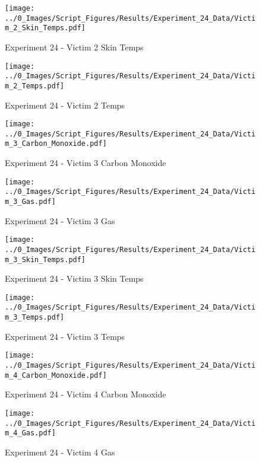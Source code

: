 	\begin{figure}[H]
		\centering
		\texttt{[image: ../0\_Images/Script\_Figures/Results/Experiment\_24\_Data/Victim\_2\_Skin\_Temps.pdf]}
		\caption[]{Experiment 24 - Victim 2 Skin Temps}
	\end{figure}
 
	\clearpage

	\begin{figure}[H]
		\centering
		\texttt{[image: ../0\_Images/Script\_Figures/Results/Experiment\_24\_Data/Victim\_2\_Temps.pdf]}
		\caption[]{Experiment 24 - Victim 2 Temps}
	\end{figure}
 

	\begin{figure}[H]
		\centering
		\texttt{[image: ../0\_Images/Script\_Figures/Results/Experiment\_24\_Data/Victim\_3\_Carbon\_Monoxide.pdf]}
		\caption[]{Experiment 24 - Victim 3 Carbon Monoxide}
	\end{figure}
 
	\clearpage

	\begin{figure}[H]
		\centering
		\texttt{[image: ../0\_Images/Script\_Figures/Results/Experiment\_24\_Data/Victim\_3\_Gas.pdf]}
		\caption[]{Experiment 24 - Victim 3 Gas}
	\end{figure}
 

	\begin{figure}[H]
		\centering
		\texttt{[image: ../0\_Images/Script\_Figures/Results/Experiment\_24\_Data/Victim\_3\_Skin\_Temps.pdf]}
		\caption[]{Experiment 24 - Victim 3 Skin Temps}
	\end{figure}
 
	\clearpage

	\begin{figure}[H]
		\centering
		\texttt{[image: ../0\_Images/Script\_Figures/Results/Experiment\_24\_Data/Victim\_3\_Temps.pdf]}
		\caption[]{Experiment 24 - Victim 3 Temps}
	\end{figure}
 

	\begin{figure}[H]
		\centering
		\texttt{[image: ../0\_Images/Script\_Figures/Results/Experiment\_24\_Data/Victim\_4\_Carbon\_Monoxide.pdf]}
		\caption[]{Experiment 24 - Victim 4 Carbon Monoxide}
	\end{figure}
 
	\clearpage

	\begin{figure}[H]
		\centering
		\texttt{[image: ../0\_Images/Script\_Figures/Results/Experiment\_24\_Data/Victim\_4\_Gas.pdf]}
		\caption[]{Experiment 24 - Victim 4 Gas}
	\end{figure}
 

